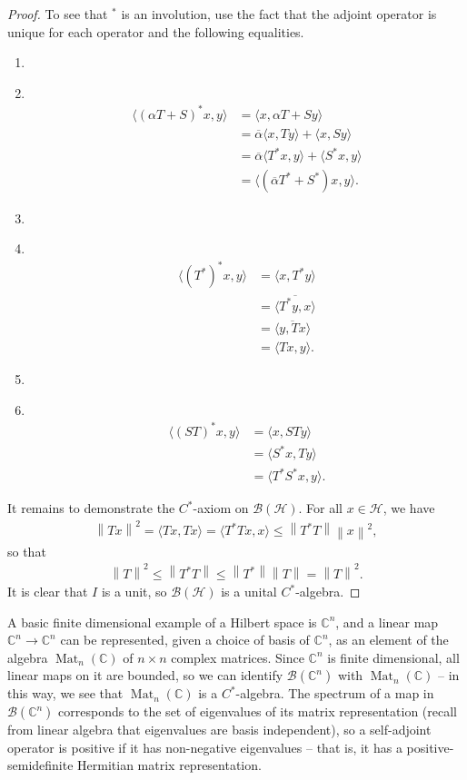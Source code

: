 \documentclass[11pt,a4paper]{report}
\theoremstyle{plain}
\theoremstyle{definition}
\newcommand{\1}{\mathbbm{1}}
\newcommand{\C}{\mathbb{C}}
\renewcommand{\H}{\mathcal{H}}
\newcommand{\B}{\mathcal{B}}
\newcommand{\BH}{\mathcal{\B(\H)}}
\newcommand\Item[1][]{ 						%
  \ifx\relax#1\relax  \item \else \item[#1] \fi
  \abovedisplayskip=0pt\abovedisplayshortskip=0pt~\vspace*{-\baselineskip}}
\DeclareMathOperator{\Mat}{\operatorname{Mat}}
\begin{document}
\begin{proof}
	To see that $^\ast$ is an involution, use the fact that the adjoint 
	operator is unique for each operator and the following equalities.
	\begin{enumerate}
	\Item	\begin{align*}
				\langle (\alpha T+S)^\ast x,y\rangle 
			&=	\langle x, \alpha T+S y \rangle												\\
			&=	\overline{\alpha}\langle x,Ty\rangle + \langle x, Sy \rangle				\\
			&=	\overline{\alpha}\langle T^\ast x,y\rangle +
										 \langle S^\ast x, y \rangle						\\
			&=	\langle(\overline{\alpha} T^\ast + S^\ast) x, y \rangle.
			\end{align*}
	\Item 	\begin{align*}
				\langle (T^\ast)^\ast x,y\rangle 
			&=	\langle x, T^\ast y \rangle													\\
			&=	\overline{\langle T^\ast y,x \rangle}										\\
			&=	\overline{\langle y, Tx \rangle}											\\
			&=	\langle Tx,y\rangle.
			\end{align*}
	\Item	\begin{align*}
				\langle (ST)^\ast x,y \rangle
			&=	\langle x, STy \rangle														\\
			&=	\langle	S^\ast x,Ty \rangle													\\
			&=	\langle T^\ast S^\ast x,y \rangle.
		\end{align*}
	\end{enumerate}
	It remains to demonstrate the $C^\ast$-axiom on $\BH$. For all $x\in\H$, we have
	\begin{align*}
		\left\|Tx\right\|^2 = \langle Tx,Tx\rangle 
							=  \langle T^\ast Tx,x\rangle 
							\leq \left\|T^\ast T\right\| \left\|x\right\|^2,
	\end{align*}
	so that
	\begin{align*}
		\left\|T\right\|^2 	\leq \left\|T^\ast T\right\| 
							\leq \left\|T^\ast\right\| \left\|T\right\| 
							= \left\|T\right\|^2.
	\end{align*}
	It is clear that $I$ is a unit, so $\BH$ is a unital $C^\ast$-algebra.
\end{proof} 

A basic finite dimensional example of a Hilbert space is $\C^n$, and a linear 
map $\C^n\to\C^n$ can be represented, given a choice of basis of $\C^n$, as an 
element of the algebra $\Mat_n(\C)$ of $n\times n$ complex matrices. Since 
$\C^n$ is finite dimensional, all linear maps on it are bounded, so we can 
identify $\B(\C^n)$ with $\Mat_n(\C)$ -- in this way, 
we see that $\Mat_n(\C)$ is a $C^\ast$-algebra.
The spectrum of a map in $\B(\C^n)$ corresponds to the set of eigenvalues of 
its matrix representation (recall from linear algebra that eigenvalues are 
basis independent), so a self-adjoint operator is positive if it has 
non-negative eigenvalues -- that is, it has a positive-semidefinite Hermitian
matrix representation.
\end{document}
